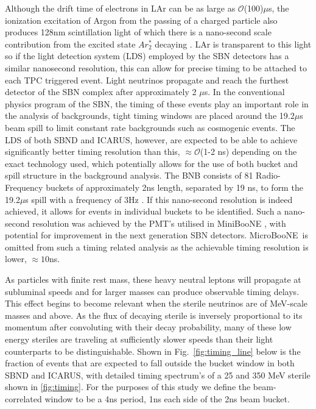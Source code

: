 \documentclass[11pt, a4paper]{article}
\newcommand{\reffig}[1]{Fig.~\ref{#1}}
\def\muboone{MicroBooNE}
\begin{document}
Although the drift time of electrons in LAr can be as large as $\mathcal{O}$(100)$\mu$s, the ionization excitation of Argon from the passing of a charged particle also produces 128nm scintillation light of which there is a nano-second scale contribution from the excited state $Ar^*_2$ decaying \cite{Acciarri:2015hha}. LAr is transparent to this light so if the light detection system (LDS) employed by the SBN detectors has a similar nanosecond resolution, this can allow for precise timing to be attached to each TPC triggered event. Light neutrinos propagate and reach the furthest detector
of the SBN complex after approximately 2 $\mu$s. In the conventional physics program
of the SBN, the timing of these events play an important role in the analysis
of backgrounds, tight timing windows are placed around the 19.2$\mu$s beam
spill to limit constant rate backgrounds such as cosmogenic events. The LDS of both SBND
and ICARUS, however, are expected to be able to achieve significantly better
timing resolution than this, $\approx \mathcal{O}$(1-2 ns) depending on the exact technology used, which potentially allows for the use of both bucket
and spill structure in the background analysis. The BNB consists of 81
Radio-Frequency buckets of approximately 2ns length, separated by 19 ns, to
form the 19.2$\mu$s spill with a frequency of 3Hz \cite{Antonello:2015lea}.
If this nano-second resolution is indeed achieved, it allows for events in individual buckets to be
identified. Such a nano-second resolution was achieved by the PMT's utilised in MiniBooNE \cite{Antonello:2015lea}, with potential for improvement in the next generation SBN detectors. \muboone\ is omitted from such a timing related analysis as the achievable timing
resolution is lower, $\approx 10$ns.

As particles with finite rest mass, these heavy neutral leptons will propagate
at subluminal speeds and for larger masses can produce observable timing
delays. This effect begins to become relevant when the sterile neutrinos are of
MeV-scale masses and above. As the flux of decaying sterile is inversely
proportional to its momentum after convoluting with their decay probability, many of these low energy steriles are
traveling at sufficiently slower speeds than their light counterparts to be distinguishable. Shown
in \reffig{fig:timing_line} below is the fraction of events that are expected
to fall outside the  bucket window in both SBND and ICARUS, with detailed
timing spectrum's of a 25 and 350 MeV sterile shown in \ref{fig:timing}. For the purposes of this study we define the beam-correlated window to be a 4ns period, 1ns each side of the 2ns beam bucket.
\end{document}
